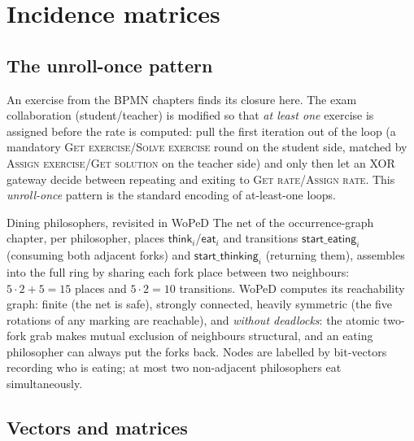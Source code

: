 \section{Incidence matrices}

\subsection{The unroll-once pattern}

An exercise from the BPMN chapters finds its closure here. The exam collaboration (student/teacher) is modified so that \emph{at least one} exercise is assigned before the rate is computed: pull the first iteration out of the loop (a mandatory \textsc{Get exercise}/\textsc{Solve exercise} round on the student side, matched by \textsc{Assign exercise}/\textsc{Get solution} on the teacher side) and only then let an XOR gateway decide between repeating and exiting to \textsc{Get rate}/\textsc{Assign rate}. This \emph{unroll-once} pattern is the standard encoding of at-least-one loops.

\begin{examplebox}{Dining philosophers, revisited in WoPeD}
The net of the occurrence-graph chapter, per philosopher, places $\textsf{think}_i$/$\textsf{eat}_i$ and transitions $\textsf{start\_eating}_i$ (consuming both adjacent forks) and $\textsf{start\_thinking}_i$ (returning them), assembles into the full ring by sharing each fork place between two neighbours: $5 \cdot 2 + 5 = 15$ places and $5 \cdot 2 = 10$ transitions. WoPeD computes its reachability graph: finite (the net is safe), strongly connected, heavily symmetric (the five rotations of any marking are reachable), and \emph{without deadlocks}: the atomic two-fork grab makes mutual exclusion of neighbours structural, and an eating philosopher can always put the forks back. Nodes are labelled by bit-vectors recording who is eating; at most two non-adjacent philosophers eat simultaneously.
\end{examplebox}

\subsection{Vectors and matrices}

